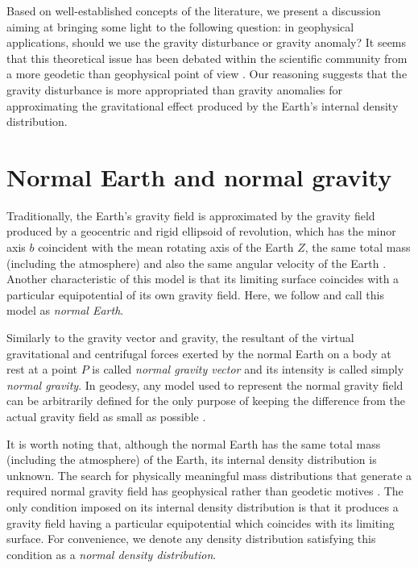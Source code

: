 \documentclass[extra]{gji}
\begin{document}
Based on well-established concepts of the literature,
we present a discussion aiming at bringing some
light to the following question: in geophysical applications,
should we use the gravity disturbance or gravity anomaly?
It seems that this theoretical issue has been 
debated within the scientific community from a 
more geodetic than geophysical point of view
\citep{lafehr1991,chapin1996,li2001,fairhead2003,
hackney-featherstone2003,hinze2005}.
Our reasoning suggests that the gravity 
disturbance is more appropriated than gravity anomalies for 
approximating the gravitational effect produced by the Earth's 
internal density distribution.


\section{Normal Earth and normal gravity}

Traditionally, the Earth's gravity field is approximated 
by the gravity field produced by a geocentric and rigid ellipsoid 
of revolution, which has the minor axis $b$ 
coincident with the mean rotating axis of the Earth $Z$, the 
same total mass (including the atmosphere) and also the
same angular velocity of the Earth \citep{heiskanen-moritz1967,
vanicek1987,hofmann-wellenhof-moritz2005,torge2012}.
Another characteristic of this model is that its
limiting surface coincides with a particular equipotential 
of its own gravity field.
Here, we follow \citep{torge2012} and call this model as
\textit{normal Earth}.

Similarly to the gravity vector and gravity, 
the resultant of the virtual 
gravitational and centrifugal forces exerted by the normal
Earth on a body at rest at a point $P$ is called 
\textit{normal gravity vector} and its intensity is called 
simply \textit{normal gravity}.
In geodesy, any model used to represent the normal gravity field
can be arbitrarily defined for the only purpose
of keeping the difference from the actual gravity field as small 
as possible \citep{vanicek1987}.

It is worth noting that, although the normal Earth has the
same total mass (including the atmosphere) of the Earth,
its internal density distribution is unknown.
The search for physically meaningful mass distributions 
that generate a required normal gravity field
has geophysical rather than geodetic motives \citep{marussi1974}.
The only condition imposed on its internal density
distribution is that it produces a gravity field
having a particular equipotential which coincides
with its limiting surface.
For convenience, we denote any density distribution 
satisfying this condition as a \textit{normal density distribution}.
\end{document}
